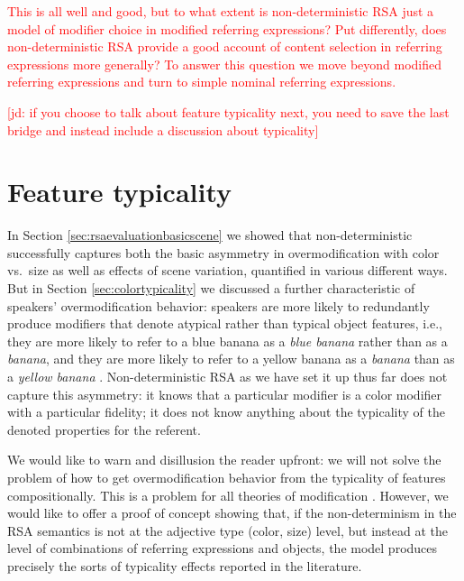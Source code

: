 \documentclass[11pt]{article}
\newcommand{\red}[1]{\textcolor{Red}{#1}}
\newcommand{\jd}[1]{\textcolor{Red}{[jd: #1]}}
\newcommand{\sectionref}[1]{Section \ref{#1}}
\begin{document}
\red{This is all well and good, but to what extent is non-deterministic RSA just a model of modifier choice in modified referring expressions? Put differently, does non-deterministic RSA provide a good account of content selection in referring expressions more generally? To answer this question we move beyond modified referring expressions and turn to simple nominal referring expressions.}

\jd{if you choose to talk about feature typicality next, you need to save the last bridge and instead include a discussion about typicality}



\section{Feature typicality}

In \sectionref{sec:rsaevaluationbasicscene} we showed that non-deterministic successfully captures both the basic asymmetry in overmodification with color vs.~size as well as effects of scene variation, quantified in various different ways. But in \sectionref{sec:colortypicality} we discussed a further characteristic of speakers' overmodification behavior: speakers are more likely to redundantly produce modifiers that denote atypical rather than typical object features, i.e., they are more likely to refer to a blue banana as a \emph{blue banana} rather than as a \emph{banana}, and they are more likely to refer to a yellow banana as a \emph{banana} than as a \emph{yellow banana} \cite{sedivy2003a, Westerbeek2015}. Non-deterministic RSA as we have set it up thus far does not capture this asymmetry: it knows that a particular modifier is a color modifier with a particular fidelity; it does not know anything about the typicality of the denoted properties for the referent. 

We would like to warn and disillusion the reader upfront: we will not solve the problem of how to get overmodification behavior from the typicality of features compositionally. This is a problem for all theories of modification \cite{kamp1995}. However, we would like to offer a proof of concept showing that, if the non-determinism in the RSA semantics is not at the adjective type (color, size) level, but instead at the level of combinations of referring expressions and objects, the model produces precisely the sorts of typicality effects reported in the literature. 
\end{document}
